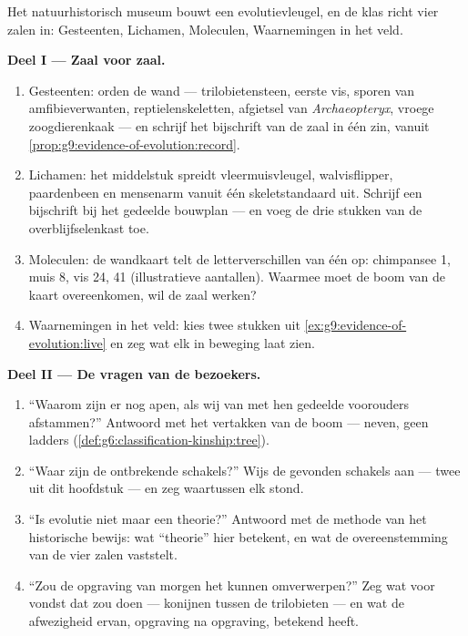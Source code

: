 \begin{problem}\label{pb:g9:evidence-of-evolution:1}
Het natuurhistorisch museum bouwt een evolutievleugel, en de klas
richt vier zalen in: Gesteenten, Lichamen, Moleculen,
Waarnemingen in het veld.

\medskip\noindent\textbf{Deel I --- Zaal voor zaal.}
\begin{enumerate}
  \item Gesteenten: orden de wand --- trilobietensteen, eerste
        vis, sporen van amfibieverwanten, reptielenskeletten,
        afgietsel van \emph{Archaeopteryx}, vroege
        zoogdierenkaak --- en schrijf het bijschrift van de zaal
        in één zin, vanuit
        \cref{prop:g9:evidence-of-evolution:record}.
  \item Lichamen: het middelstuk spreidt vleermuisvleugel,
        walvisflipper, paardenbeen en mensenarm vanuit één
        skeletstandaard uit. Schrijf een bijschrift bij het
        gedeelde bouwplan --- en voeg de drie stukken van de
        overblijfselenkast toe.
  \item Moleculen: de wandkaart telt de letterverschillen van
        één  op: chimpansee 1, muis 8, vis 24,  41
        (illustratieve aantallen). Waarmee moet de boom van de
        kaart overeenkomen, wil de zaal werken?
  \item Waarnemingen in het veld: kies twee stukken uit
        \cref{ex:g9:evidence-of-evolution:live} en zeg wat elk
        in beweging laat zien.
\end{enumerate}

\medskip\noindent\textbf{Deel II --- De vragen van de
bezoekers.}
\begin{enumerate}[resume]
  \item ``Waarom zijn er nog apen, als wij van met hen gedeelde
        voorouders afstammen?'' Antwoord met het vertakken van de
        boom --- neven, geen ladders
        (\cref{def:g6:classification-kinship:tree}).
  \item ``Waar zijn de ontbrekende schakels?'' Wijs de gevonden
        schakels aan --- twee uit dit hoofdstuk --- en zeg
        waartussen elk stond.
  \item ``Is evolutie niet maar een theorie?'' Antwoord met de
        methode van het historische bewijs: wat ``theorie'' hier
        betekent, en wat de overeenstemming van de vier zalen
        vaststelt.
  \item ``Zou de opgraving van morgen het kunnen omverwerpen?''
        Zeg wat voor vondst dat zou doen --- konijnen tussen de
        trilobieten --- en wat de afwezigheid ervan, opgraving na
        opgraving, betekend heeft.
\end{enumerate}


\end{problem}
